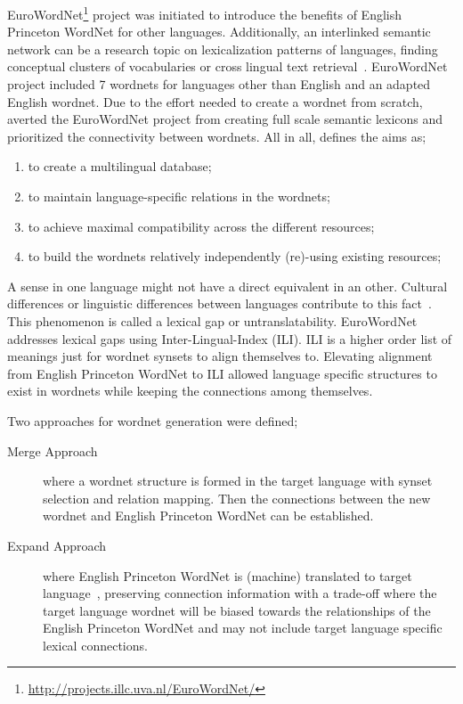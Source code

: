 EuroWordNet\footnote{\url{http://projects.illc.uva.nl/EuroWordNet/}} project was initiated to introduce the benefits of English Princeton WordNet for other languages.
Additionally, an interlinked semantic network can be a research topic on lexicalization patterns of languages, finding conceptual clusters of vocabularies or cross lingual text retrieval~\cite{gonzalo_applying_1998, vossen_introduction_1998}.
EuroWordNet project included 7 wordnets for languages other than English and an adapted English wordnet.
Due to the effort needed to create a wordnet from scratch, \citeauthor{vossen_introduction_1998} averted the EuroWordNet project from creating full scale semantic lexicons and prioritized the connectivity between wordnets.
All in all, \textcite{vossen_introduction_1998} defines the aims as;
\begin{displayquote}
    \begin{enumerate}
        \item to create a multilingual database;
        \item to maintain language-specific relations in the wordnets;
        \item to achieve maximal compatibility across the different resources;
        \item to build the wordnets relatively independently (re)-using existing resources;
    \end{enumerate}
\end{displayquote}

A sense in one language might not have a direct equivalent in an other.
Cultural differences or linguistic differences between languages contribute to this fact~\cite{kitamura_cultural_2009}.
This phenomenon is called a lexical gap or untranslatability.
EuroWordNet addresses lexical gaps using Inter-Lingual-Index (ILI).
ILI is a higher order list of meanings just for wordnet synsets to align themselves to.
Elevating alignment from English Princeton WordNet to ILI allowed language specific structures to exist in wordnets while keeping the connections among themselves.

Two approaches for wordnet generation were defined;
\begin{description}
    \item[Merge Approach] where a wordnet structure is formed in the target language with synset selection and relation mapping. Then the connections between the new wordnet and English Princeton WordNet can be established.
    \item[Expand Approach] where English Princeton WordNet is (machine) translated to target language~\cite{knight_building_1994}, preserving connection information with a trade-off where the target language wordnet will be biased towards the relationships of the English Princeton WordNet and may not include target language specific lexical connections.
\end{description}

